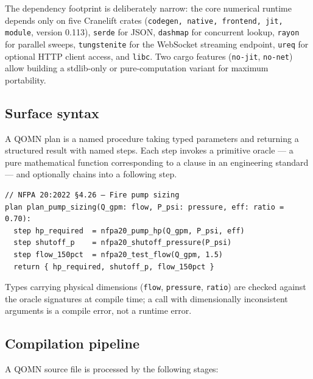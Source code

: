 \documentclass[11pt,a4paper]{article}
\begin{document}
The dependency footprint is deliberately narrow: the core numerical runtime depends only on five Cranelift crates (\texttt{codegen, native, frontend, jit, module}, version 0.113), \texttt{serde} for JSON, \texttt{dashmap} for concurrent lookup, \texttt{rayon} for parallel sweeps, \texttt{tungstenite} for the WebSocket streaming endpoint, \texttt{ureq} for optional HTTP client access, and \texttt{libc}. Two cargo features (\texttt{no-jit}, \texttt{no-net}) allow building a stdlib-only or pure-computation variant for maximum portability.

\subsection{Surface syntax}

A QOMN plan is a named procedure taking typed parameters and returning a structured result with named steps. Each step invokes a primitive oracle --- a pure mathematical function corresponding to a clause in an engineering standard --- and optionally chains into a following step.

\begin{lstlisting}
// NFPA 20:2022 §4.26 — Fire pump sizing
plan plan_pump_sizing(Q_gpm: flow, P_psi: pressure, eff: ratio = 0.70):
  step hp_required  = nfpa20_pump_hp(Q_gpm, P_psi, eff)
  step shutoff_p    = nfpa20_shutoff_pressure(P_psi)
  step flow_150pct  = nfpa20_test_flow(Q_gpm, 1.5)
  return { hp_required, shutoff_p, flow_150pct }
\end{lstlisting}

Types carrying physical dimensions (\texttt{flow}, \texttt{pressure}, \texttt{ratio}) are checked against the oracle signatures at compile time; a call with dimensionally inconsistent arguments is a compile error, not a runtime error.

\subsection{Compilation pipeline}

A QOMN source file is processed by the following stages:
\end{document}
